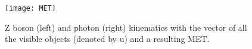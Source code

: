 \begin{figure}[H]
\centering
\texttt{[image: MET]}
\caption{ Z boson (left) and photon (right) kinematics with the vector of all the visible objects (denoted by u) and a resulting MET.}
\label{fig:MET}
\end{figure}


